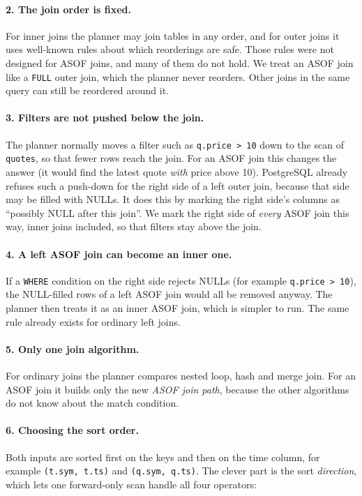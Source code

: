 \documentclass[11pt,a4paper]{article}
\newcommand{\code}[1]{\texttt{#1}}
\begin{document}
\paragraph{2. The join order is fixed.}
For inner joins the planner may join tables in any order, and for outer joins it uses
well-known rules about which reorderings are safe. Those rules were not designed for ASOF
joins, and many of them do not hold. We treat an ASOF join like a \code{FULL} outer join,
which the planner never reorders. Other joins in the same query can still be reordered
around it.

\paragraph{3. Filters are not pushed below the join.}
The planner normally moves a filter such as \code{q.price > 10} down to the scan of
\code{quotes}, so that fewer rows reach the join. For an ASOF join this changes the
answer (it would find the latest quote \emph{with} price above 10). PostgreSQL already
refuses such a push-down for the right side of a left outer join, because that side may
be filled with NULLs. It does this by marking the right side's columns as ``possibly NULL
after this join''. We mark the right side of \emph{every} ASOF join this way, inner joins
included, so that filters stay above the join.

\paragraph{4. A left ASOF join can become an inner one.}
If a \code{WHERE} condition on the right side rejects NULLs (for example
\code{q.price > 10}), the NULL-filled rows of a left ASOF join would all be removed
anyway. The planner then treats it as an inner ASOF join, which is simpler to run. The
same rule already exists for ordinary left joins.

\paragraph{5. Only one join algorithm.}
For ordinary joins the planner compares nested loop, hash and merge join. For an ASOF
join it builds only the new \emph{ASOF join path}, because the other algorithms do not
know about the match condition.

\paragraph{6. Choosing the sort order.}
Both inputs are sorted first on the keys and then on the time column, for example
\code{(t.sym, t.ts)} and \code{(q.sym, q.ts)}. The clever part is the sort
\emph{direction}, which lets one forward-only scan handle all four operators:
\end{document}
